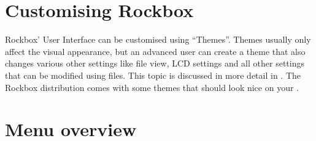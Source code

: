 \section{Customising Rockbox}
Rockbox' User Interface can be customised using ``Themes''. Themes usually
only affect the visual appearance, but an advanced user can create a theme
that also changes various other settings like file view, LCD settings and
all other settings that can be modified using  files. This topic
is discussed in more detail in .
The Rockbox distribution comes with some themes that should look nice on
your \dap{}. 

\section{Menu overview}
%


